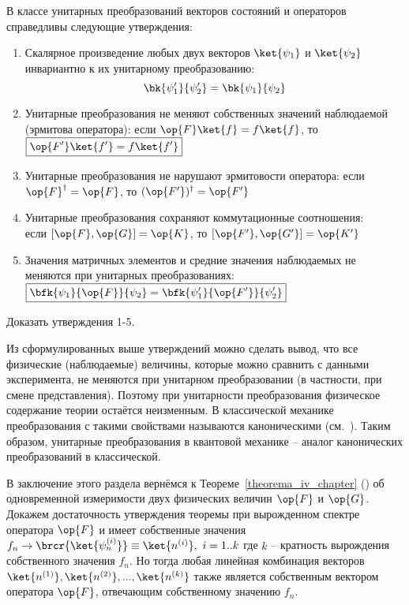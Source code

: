 В классе унитарных преобразований векторов состояний и операторов справедливы следующие утверждения:

\begin{enumerate}

\item Скалярное произведение любых двух векторов $\ket{\psi_1}$ и $\ket{\psi_2}$ инвариантно к их унитарному преобразованию:
$$
\bk{\psi'_1}{\psi'_2}=\bk{\psi_1}{\psi_2}
$$

\item Унитарные преобразования не меняют собственных значений наблюдаемой (эрмитова оператора): если $\op{F}\ket{f}=f\ket{f}$, то $\boxed{\op{F'}\ket{f'}=f\ket{f'}}$

\item Унитарные преобразования не нарушают эрмитовости оператора: если $\op{F}^\dag=\op{F}$, то $(\op{F'})^\dag=\op{F'}$

\item Унитарные преобразования сохраняют коммутационные соотношения: \\
если $[\op{F}, \op{G}]=\op{K}$, то $[\op{F'}, \op{G'}]=\op{K'}$

\item Значения матричных элементов и средние значения наблюдаемых не меняются при унитарных преобразованиях: $\boxed{\bfk{\psi_1}{\op{F}}{\psi_2}=\bfk{\psi'_1}{\op{F'}}{\psi'_2}}$
\end{enumerate}

\begin{excr}
Доказать утверждения 1-5.
\end{excr}

Из сформулированных выше утверждений можно сделать вывод, что все физические (наблюдаемые) величины, которые можно сравнить с данными эксперимента, не меняются при унитарном преобразовании (в частности, при смене представления). Поэтому при унитарности преобразования физическое содержание теории остаётся неизменным. В классической механике преобразования с такими свойствами называются каноническими (см.~). Таким образом, унитарные преобразования в квантовой механике -- аналог канонических преобразований в классической.

В заключение этого раздела вернёмся к Теореме~\ref{theorema_iv_chapter} () об одновременной измеримости двух физических величин $\op{F}$ и $\op{G}$. Докажем достаточность утверждения теоремы при вырожденном спектре оператора $\op{F}$ и имеет собственные значения $f_n \rightarrow \brcr{\ket{\psi_n^{(i)}}} \equiv \ket{n^{(i)}},~i = 1..k$ где $k$ -- кратность вырождения собственного значения $f_n$. Но тогда любая линейная комбинация векторов $\ket{n^{(1)}}, \ket{n^{(2)}}, ..., \ket{n^{(k)}}$ также является собственным вектором оператора $\op{F}$, отвечающим собственному значению $f_n$.

